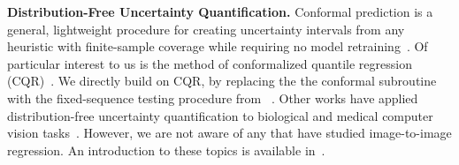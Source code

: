 \documentclass[10pt]{article}
\begin{document}
\textbf{Distribution-Free Uncertainty Quantification.} Conformal prediction is a general, lightweight procedure for creating uncertainty intervals from any heuristic with finite-sample coverage while requiring no model retraining~\cite{vovk1999machine,vovk2005algorithmic,lei2013conformal,lei2013distribution,lei2014classification,Sadinle2016LeastAS}. 
Of particular interest to us is the method of conformalized quantile regression (CQR)~\cite{romano2019conformalized}.  
We directly build on CQR, by replacing the the conformal subroutine with the fixed-sequence testing procedure from ~\cite{bates2021distribution,angelopoulos2021learn}.
Other works have applied distribution-free uncertainty quantification to biological and medical computer vision tasks~\cite{hechtlinger2018cautious,cauchois2020knowing,romano2020classification,angelopoulos2020sets,angelopoulos2021private,lu2021fair}.
However, we are not aware of any that have studied image-to-image regression.
An introduction to these topics is available in~\cite{angelopoulos2021gentle}.

\printbibliography

\clearpage
\appendix
\end{document}
